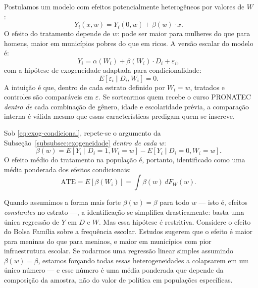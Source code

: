 Postulamos um modelo com efeitos potencialmente heterogêneos por valores de $W$:
\begin{equation}
Y_i(x, w) = Y_i(0, w) + \beta(w) \cdot x.
\label{eq:modelo-cov}
\end{equation}
O efeito do tratamento depende de $w$: pode ser maior para mulheres do que para homens, maior em municípios pobres do que em ricos. A versão escalar do modelo é:
\begin{equation}
Y_i = \alpha(W_i) + \beta(W_i) \cdot D_i + \varepsilon_i,
\label{eq:modelo-cov-escalar}
\end{equation}
com a hipótese de exogeneidade adaptada para condicionalidade:
\begin{equation}
E[\varepsilon_i \mid D_i, W_i] = 0.
\label{eq:exog-condicional}
\end{equation}
A intuição é que, dentro de cada estrato definido por $W_i = w$, tratados e controles são comparáveis em $\varepsilon$. Se sortearmos quem recebe o curso PRONATEC \textit{dentro de} cada combinação de gênero, idade e escolaridade prévia, a comparação interna é válida mesmo que essas características predigam quem se inscreve.

Sob \eqref{eq:exog-condicional}, repete-se o argumento da Subseção~\ref{subsubsec:exogeneidade} \textit{dentro de cada $w$}:
\begin{equation}
\beta(w) = E[Y_i \mid D_i = 1, W_i = w] - E[Y_i \mid D_i = 0, W_i = w].
\label{eq:beta-w}
\end{equation}
O efeito médio do tratamento na população é, portanto, identificado como uma média ponderada dos efeitos condicionais:
\begin{equation}
\text{ATE} = E[\beta(W_i)] = \int \beta(w) \, dF_W(w).
\label{eq:ate-medio}
\end{equation}

Quando assumimos a forma mais forte $\beta(w) = \beta$ para todo $w$ --- isto é, efeitos \textit{constantes} no estrato ---, a identificação se simplifica drasticamente: basta uma única regressão de $Y$ em $D$ e $W$. Mas essa hipótese é restritiva. Considere o efeito do Bolsa Família sobre a frequência escolar. Estudos sugerem que o efeito é maior para meninas do que para meninos, e maior em municípios com pior infraestrutura escolar. Se rodarmos uma regressão linear simples assumindo $\beta(w) = \beta$, estamos forçando todas essas heterogeneidades a colapsarem em um único número --- e esse número é uma média ponderada que depende da composição da amostra, não do valor de política em populações específicas.

